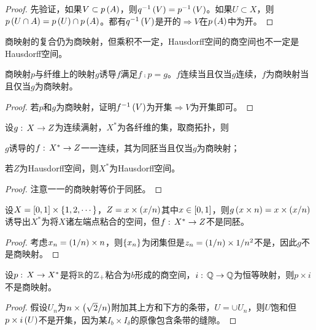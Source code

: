 \documentclass{ctexrep}
\begin{document}
  \begin{proof}
    先验证，如果$V\subset p\left(A\right)$，则$q^{-1}\left(V\right) = p^{-1}\left(V\right)$。如果$U\subset X$，则$p\left(U\cap A\right)=p\left(U\right)\cap p\left(A\right)$。都有$q^{-1}\left(V\right)$是开的$\Rightarrow V$在$p\left(A\right)$中为开。
  \end{proof}
  商映射的复合仍为商映射，但乘积不一定，Hausdorff空间的商空间也不一定是Hausdorff空间。
  \begin{theorem}
    商映射$p$与纤维上的映射$g$诱导$f$满足$f\comp p=g$。$f$连续当且仅当$g$连续，$f$为商映射当且仅当$g$为商映射。
  \end{theorem}
  \centerline{}{}
  \begin{proof}
    若$p$和$g$为商映射，证明$f^{-1}\left(V\right)$为开集$\Rightarrow V$为开集即可。
  \end{proof}
  \begin{corollary}
    设$g:\, X \rightarrow Z$为连续满射，$X^*$为各纤维的集，取商拓扑，则
    \begin{cenum}
      \item $g$诱导的$f:\, X^* \rightarrow Z$一一连续，其为同胚当且仅当$g$为商映射；
      \item 若$Z$为Hausdorff空间，则$X^*$为Hausdorff空间。
    \end{cenum}
  \end{corollary}
  \centerline{}{}
  \begin{proof}
    注意一一的商映射等价于同胚。
  \end{proof}
  \begin{ex}
    设$X=\left[0,1\right]\times\left\{1,2,\cdots\right\}$，$Z=x\times \left(x/n\right)$其中$x\in\left[0,1\right]$，则$g\left(x\times n\right) = x\times\left(x/n\right)$诱导出$X^*$为将$X$诸左端点粘合的空间，但$f:\, X^* \rightarrow Z$不是同胚。
  \end{ex}
  \begin{proof}
    考虑$x_n=\left(1/n\right)\times n$，则$\left\{x_n\right\}$为闭集但是$z_n=\left(1/n\right)\times{1/n^2}$不是，因此$g$不是商映射。
  \end{proof}
  \begin{ex}
    设$p:\, X \rightarrow X^*$是将$\mathbb{R}$的$\mathbb{Z}_+$粘合为$b$形成的商空间，$i:\, \mathbb{Q} \rightarrow \mathbb{Q}$为恒等映射，则$p\times i$不是商映射。
  \end{ex}
  \begin{proof}
    假设$U_n$为$n\times\left(\sqrt{2}/n\right)$附加其上方和下方的条带，$U=\cup U_n$，则$U$饱和但$p\times i\left(U\right)$不是开集，因为某$I_b\times I_\delta$的原像包含条带的缝隙。
  \end{proof}
\end{document}
